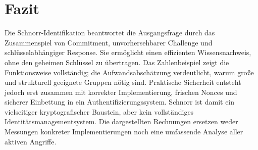 \section{Fazit}\label{sec:fazit}
Die Schnorr-Identifikation beantwortet die Ausgangsfrage durch das Zusammenspiel von Commitment, unvorhersehbarer Challenge und schlüsselabhängiger Response. Sie ermöglicht einen effizienten Wissensnachweis, ohne den geheimen Schlüssel zu übertragen. Das Zahlenbeispiel zeigt die Funktionsweise vollständig; die Aufwandsabschätzung verdeutlicht, warum große und strukturell geeignete Gruppen nötig sind. Praktische Sicherheit entsteht jedoch erst zusammen mit korrekter Implementierung, frischen Nonces und sicherer Einbettung in ein Authentifizierungssystem. Schnorr ist damit ein vielseitiger kryptografischer Baustein, aber kein vollständiges Identitätsmanagementsystem. Die dargestellten Rechnungen ersetzen weder Messungen konkreter Implementierungen noch eine umfassende Analyse aller aktiven Angriffe.
